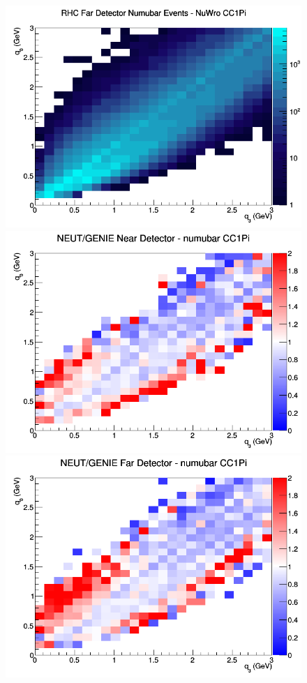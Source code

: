 \begin{figure}[h]
\endminipage
{}
\includegraphics[width=\linewidth]{eff_q0_q3/FGT/CC1Pi_RHC_FD_numubar_q3_q0_NuWro.png}
\endminipage
\newline
{}
\includegraphics[width=\linewidth]{eff_q0_q3/FGT/ratios/CC1Pi_NEUT_GENIE_numubar_near_q3_q0.png}
\endminipage
{}
\includegraphics[width=\linewidth]{eff_q0_q3/FGT/ratios/CC1Pi_NEUT_GENIE_numubar_far_q3_q0.png}

\end{figure}
